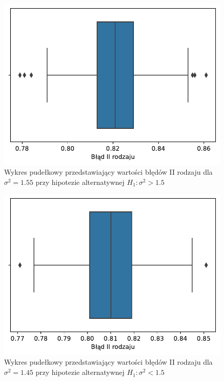 \documentclass[12pt]{mwart}
\begin{document}
	\begin{figure}[H]
	\begin{center}
		\includegraphics[scale=0.6]{box11.pdf}
		\caption{Wykres pudełkowy przedstawiający wartości błędów II rodzaju dla $\sigma^2=1.55$ przy hipotezie alternatywnej $H_1 \colon \sigma^2 > 1.5$}
	\end{center}
	\end{figure}
	
	\begin{figure}[H]
	\begin{center}
		\includegraphics[scale=0.6]{box12.pdf}
		\caption{Wykres pudełkowy przedstawiający wartości błędów II rodzaju dla $\sigma^2 = 1.45$ przy hipotezie alternatywnej $H_1 \colon \sigma^2 < 1.5$}
	\end{center}
	\end{figure}
	
\end{document}
